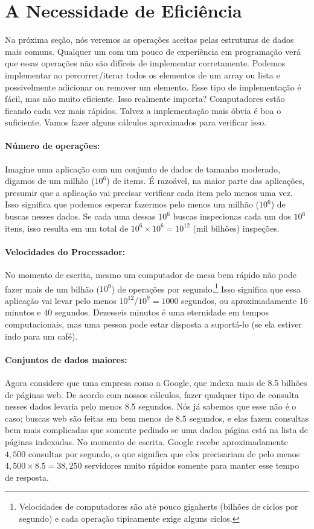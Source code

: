 \section{A Necessidade de Eficiência}
Na próxima seção, nós veremos as operações aceitas pelas estruturas de dados mais comuns.
Qualquer um com um pouco de experiência em programação verá que essas operações não são difíceis de implementar corretamente.
Podemos implementar ao percorrer/iterar todos os elementos de um array ou lista e possivelmente adicionar ou remover um elemento.
Esse tipo de implementação é fácil, mas não muito eficiente.
Isso realmente importa? Computadores estão ficando cada vez mais rápidos.
Talvez a implementação mais óbvia é boa o suficiente.
Vamos fazer alguns cálculos aproximados para verificar isso.

\paragraph{Número de operações:}
Imagine uma aplicação com um conjunto de dados de tamanho moderado, digamos de um milhão ($10^6$) de items. 
É razoável, na maior parte das aplicações, presumir que a aplicação vai precisar verificar cada item pelo menos uma vez. Isso significa que podemos esperar fazermos pelo menos um milhão ($10^6$) de buscas nesses dados. Se cada uma dessas $10^6$ buscas inspecionas cada um dos $10^6$ itens, isso resulta em um total de $10^6\times 10^6=10^{12}$ (mil bilhões) inspeções.

\paragraph{Velocidades do Processador:} No momento de escrita, mesmo um computador de mesa bem rápido não pode fazer mais de um bilhão ($10^9$) de operações por segundo.\footnote{Velocidades de computadores são até pouco gigaherts (bilhões de ciclos por segundo) e cada operação tipicamente exige alguns ciclos.}
Isso significa que essa aplicação vai levar pelo menos $10^{12}/10^9 = 1000$
segundos, ou aproximadamente 16 minutos e 40 segundos. Dezesseis minutos é uma eternidade em tempos computacionais, mas uma pessoa pode estar disposta a suportá-lo (se ela estiver indo para um café).

\paragraph{Conjuntos de dados maiores:} Agora considere que uma empresa como a Google, 
%
que indexa mais de 8.5 bilhões de páginas web. 
De acordo com nossos cálculos, fazer qualquer tipo de consulta nesses dados levaria pelo menos 8.5 segundos.
Nós já sabemos que esse não é o caso; buscas web são feitas em bem menos de 8.5 segundos, e elas fazem consultas bem mais complicadas que somente pedindo se uma dadoa página está na lista de páginas indexadas.
No momento de escrita, Google recebe aproximadamente $4,500$ consultas por segundo, o que significa que eles precisariam de pelo menos $4,500 \times 8.5 =38,250$ servidores muito rápidos somente para manter esse tempo de resposta.

